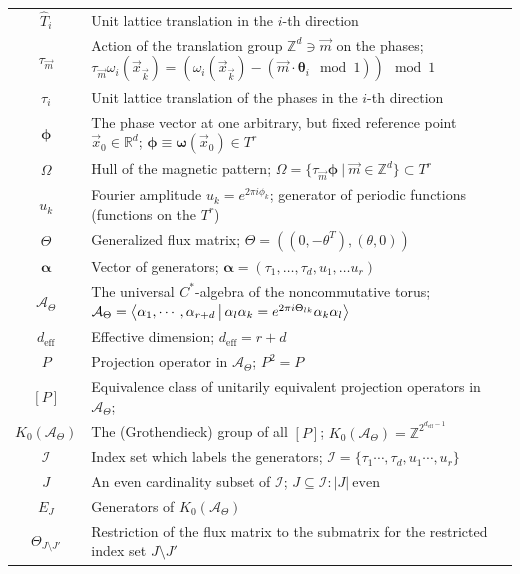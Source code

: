 \documentclass[
    10pt,
    aps,
    prb,
    twocolumn,
    floatfix,
    superscriptaddress,
]{revtex4-2}
\begin{document}
\begin{table}[t!]
\begin{tabular}{c|p{15cm}}
	$\hat{T}_{i}$ & Unit lattice translation in the $i$-th direction\\
	$\tau_{\vec{m}}$ & Action of the translation group $\mathbb{Z}^d \ni \vec{m} $ on the phases;  $  \tau_{\vec{m}}\omega_i (\vec{x}_\vec{k}) = ( \omega_i (\vec{x}_\vec{k} ) - ( \vec{m} \cdot \boldsymbol{\theta}_i \mod 1) ) \mod 1 $ \\
	$\tau_{i}$ & Unit lattice translation of the phases in the $i$-th direction\\
	$\boldsymbol{\phi} $ & The phase vector at one arbitrary, but fixed reference point $\vec{x}_0 \in \mathbb{R}^d$; $\boldsymbol{\phi} \equiv \boldsymbol{\omega}(\vec{x}_0) \in T^r$ \\
	$\Omega $ & Hull of the magnetic pattern;  $\Omega =  \lbrace \tau_{\vec{m}}\boldsymbol{\phi} ~|~ \vec{m} \in \mathbb{Z}^d \rbrace  \subset T^r $  \\
	$u_k$ & Fourier amplitude $u_k = e^{ 2 \pi i \phi_k}$; generator of periodic functions (functions on the $T^r$) \\
	$\Theta $ & Generalized flux matrix; $\Theta = ( (0, -\theta^T), (\theta,0))$ \\
	$\boldsymbol{\alpha}$ & Vector of generators; $\boldsymbol{\alpha}=(\tau_1, \ldots, \tau_d, u_1,\ldots u_r )$ \\
	$\mathcal{A}_\Theta $ & The universal $C^\ast$-algebra of the noncommutative torus; $\mathcal{A}_\Theta = \Braket{ \alpha_1, \cdots, \alpha_{r+d}
    |  \alpha_l \alpha_k = e^{ 2 \pi i \Theta_{lk}} \alpha_k  \alpha_l }$\\
	$d_{\mathrm{eff}} $ & Effective dimension; $d_{\mathrm{eff}} = r+d $ \\
	$P$ & Projection operator in $\mathcal{A}_\Theta$; $P^2 = P$ \\
	$[P]$ & Equivalence class of unitarily equivalent projection operators in $\mathcal{A}_\Theta$; \\
	$K_0(\mathcal{A}_\Theta) $ & The (Grothendieck) group of all $[P]$; $K_0(\mathcal{A}_\Theta)  = \mathbb{Z}^{2^{d_\mathrm{eff}-1}}$ \\
	$\mathcal{I}$ & Index set which labels the generators; $\mathcal{I}=\lbrace \tau_1 \cdots, \tau_d, u_1  \cdots, u_r \rbrace$ 
	\\
	$J$ & An even cardinality subset of $\mathcal{I}$; $ J \subseteq \mathcal{I} \colon |J|~\mathrm{even}$ \\
	$E_J$ & Generators of $K_0(\mathcal{A}_\Theta) $ \\ 
	$\Theta_{J\setminus J'}$ & Restriction of the flux matrix to the submatrix for the restricted index set $J \setminus J'$ \\

\end{tabular}
\end{table}
\end{document}
